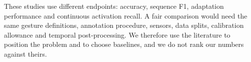 \iffull
These studies use different endpoints: accuracy, sequence F1, adaptation performance and continuous activation recall. A fair comparison would need the same gesture definitions, annotation procedure, sensors, data splits, calibration allowance and temporal post-processing. We therefore use the literature to position the problem and to choose baselines, and we do not rank our numbers against theirs.

\fi